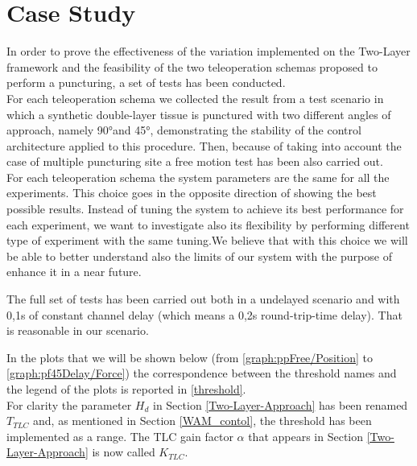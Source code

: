 \chapter{Case Study}
In order to prove the effectiveness of the variation implemented on the Two-Layer framework and the feasibility of the two teleoperation schemas proposed to perform a puncturing, a set of tests has been conducted.\\
For each teleoperation schema we collected the result from a test scenario in which a synthetic double-layer tissue is punctured with two different angles of approach, namely 90°and 45°, demonstrating the stability of the control architecture applied to this procedure.
Then, because of taking into account the case of multiple puncturing site a free motion test has been also carried out.\\
For each teleoperation schema the system parameters are the same for all the experiments.
This choice goes in the opposite direction of showing the best possible results. Instead of tuning the system to achieve its best performance for each experiment, we want to investigate also its flexibility by performing different type of experiment with the same tuning.We believe that with this choice we will be able to better understand also the limits of our system with the purpose of enhance it in a near future.

The full set of tests has been carried out both in a undelayed scenario and with 0,1s of constant channel delay (which means a 0,2s round-trip-time  delay). That is reasonable in our scenario. 

In the plots that we will be shown below (from \figurename{ \ref{graph:ppFree/Position}} to \figurename{ \ref{graph:pf45Delay/Force}}) the correspondence between the threshold names and the legend of the plots is reported in \tablename{ \ref{threshold}}.\\
For clarity the parameter $H_{d}$ in Section \ref{Two-Layer-Approach} has been renamed $T_{TLC}$ and, as mentioned in Section \ref{WAM_contol}, the threshold has been implemented as a range.
The TLC gain factor $\alpha$ that appears in Section \ref{Two-Layer-Approach} is now called $K_{TLC}$.

